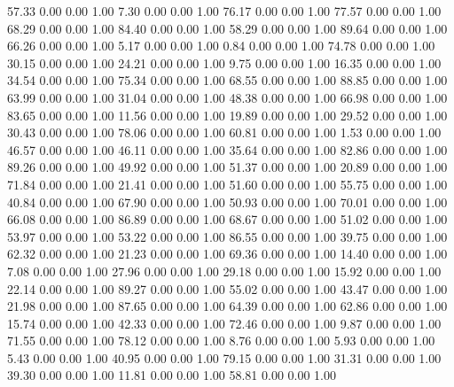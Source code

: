    57.33   0.00   0.00   1.00
    7.30   0.00   0.00   1.00
   76.17   0.00   0.00   1.00
   77.57   0.00   0.00   1.00
   68.29   0.00   0.00   1.00
   84.40   0.00   0.00   1.00
   58.29   0.00   0.00   1.00
   89.64   0.00   0.00   1.00
   66.26   0.00   0.00   1.00
    5.17   0.00   0.00   1.00
    0.84   0.00   0.00   1.00
   74.78   0.00   0.00   1.00
   30.15   0.00   0.00   1.00
   24.21   0.00   0.00   1.00
    9.75   0.00   0.00   1.00
   16.35   0.00   0.00   1.00
   34.54   0.00   0.00   1.00
   75.34   0.00   0.00   1.00
   68.55   0.00   0.00   1.00
   88.85   0.00   0.00   1.00
   63.99   0.00   0.00   1.00
   31.04   0.00   0.00   1.00
   48.38   0.00   0.00   1.00
   66.98   0.00   0.00   1.00
   83.65   0.00   0.00   1.00
   11.56   0.00   0.00   1.00
   19.89   0.00   0.00   1.00
   29.52   0.00   0.00   1.00
   30.43   0.00   0.00   1.00
   78.06   0.00   0.00   1.00
   60.81   0.00   0.00   1.00
    1.53   0.00   0.00   1.00
   46.57   0.00   0.00   1.00
   46.11   0.00   0.00   1.00
   35.64   0.00   0.00   1.00
   82.86   0.00   0.00   1.00
   89.26   0.00   0.00   1.00
   49.92   0.00   0.00   1.00
   51.37   0.00   0.00   1.00
   20.89   0.00   0.00   1.00
   71.84   0.00   0.00   1.00
   21.41   0.00   0.00   1.00
   51.60   0.00   0.00   1.00
   55.75   0.00   0.00   1.00
   40.84   0.00   0.00   1.00
   67.90   0.00   0.00   1.00
   50.93   0.00   0.00   1.00
   70.01   0.00   0.00   1.00
   66.08   0.00   0.00   1.00
   86.89   0.00   0.00   1.00
   68.67   0.00   0.00   1.00
   51.02   0.00   0.00   1.00
   53.97   0.00   0.00   1.00
   53.22   0.00   0.00   1.00
   86.55   0.00   0.00   1.00
   39.75   0.00   0.00   1.00
   62.32   0.00   0.00   1.00
   21.23   0.00   0.00   1.00
   69.36   0.00   0.00   1.00
   14.40   0.00   0.00   1.00
    7.08   0.00   0.00   1.00
   27.96   0.00   0.00   1.00
   29.18   0.00   0.00   1.00
   15.92   0.00   0.00   1.00
   22.14   0.00   0.00   1.00
   89.27   0.00   0.00   1.00
   55.02   0.00   0.00   1.00
   43.47   0.00   0.00   1.00
   21.98   0.00   0.00   1.00
   87.65   0.00   0.00   1.00
   64.39   0.00   0.00   1.00
   62.86   0.00   0.00   1.00
   15.74   0.00   0.00   1.00
   42.33   0.00   0.00   1.00
   72.46   0.00   0.00   1.00
    9.87   0.00   0.00   1.00
   71.55   0.00   0.00   1.00
   78.12   0.00   0.00   1.00
    8.76   0.00   0.00   1.00
    5.93   0.00   0.00   1.00
    5.43   0.00   0.00   1.00
   40.95   0.00   0.00   1.00
   79.15   0.00   0.00   1.00
   31.31   0.00   0.00   1.00
   39.30   0.00   0.00   1.00
   11.81   0.00   0.00   1.00
   58.81   0.00   0.00   1.00
